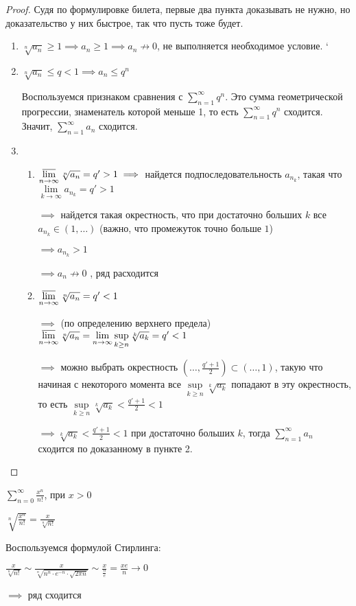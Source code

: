 \begin{proof}\thmslashn
	
	Судя по формулировке билета, первые два пункта доказывать не нужно, но доказательство у них быстрое, так что пусть тоже будет.
	\begin{enumerate}
		\item $\sqrt[n]{a_n} \ge 1 \implies a_n \ge 1 \implies a_n \not\to 0$, не выполняется необходимое условие.
		`
		\item $\sqrt[n]{a_n} \le q < 1 \implies a_n \le q^n$

		Воспользуемся признаком сравнения с $\sum\limits_{n=1}^{\infty}q^n$. Это сумма геометрической прогрессии, знаменатель которой меньше 1, то есть $\sum\limits_{n=1}^{\infty}q^n$ сходится. Значит, $\sum\limits_{n=1}^{\infty}a_n$ сходится.
		
		
		\item 
		\begin{enumerate}
			\item $\varlimsup\limits_{n \to \infty} \sqrt[n]{a_n} = q' > 1 \implies $ найдется подпоследовательность  $a_{n_k}$, такая что $\lim\limits_{k \to \infty} a_{n_k} = q' > 1$

			$\implies$ найдется такая окрестность, что при достаточно больших $k$ все $a_{n_k} \in (1, \dots)$ (важно, что промежуток точно больше $1$) 

			$\implies a_{n_k} > 1$

			$\implies a_n \not\to 0$ , ряд расходится


			\item $\varlimsup\limits_{n \to \infty} \sqrt[n]{a_n} = q'< 1$

			$\implies$ (по определению верхнего предела) $\varlimsup\limits_{n \to \infty} \sqrt[n]{a_n} = \lim\limits_{n \to \infty} \sup\limits_{k \ge n} \sqrt[k]{a_k} = q' < 1$
		

			$\implies$ можно выбрать окрестность $(\dots, \frac{q' + 1}{2}) \subset (\dots, 1)$, такую что начиная с некоторого момента все $\sup\limits_{k \ge n} \sqrt[k]{a_k}$ попадают в эту окрестность, то есть $\sup\limits_{k \ge n} \sqrt[k]{a_k} < \frac{q' + 1}{2} < 1$

			$\implies \sqrt[k]{a_k} < \frac{q' + 1}{2} < 1$ при достаточно больших $k$, тогда $\sum\limits_{n=1}^{\infty}a_n$ сходится по доказанному в пункте 2.

	\end{enumerate}
	\end{enumerate}
\end{proof}
\begin{example}\thmslashn
	
	$\sum\limits_{n = 0}^{\infty} \frac{x^n}{n!}$, при $x > 0$
	
		
	$\sqrt[n]{\frac{x^n}{n!}} = \frac{x}{\sqrt[n]{n!}}$ 

	Воспользуемся формулой Стирлинга:

	$ \frac{x}{\sqrt[n]{n!}} \sim \frac{x}{\sqrt[n]{n^n\cdot e^{-n} \cdot \sqrt{2\pi n}}}\sim \frac x {\frac ne} = \frac{xe}{n} \to 0$

	$\implies $ ряд сходится
\end{example}


